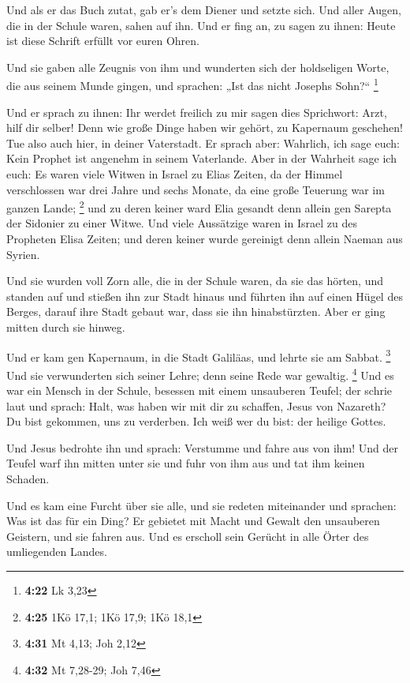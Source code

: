  Und als er das Buch zutat, gab er's dem Diener und
setzte sich. Und aller Augen, die in der Schule waren, sahen auf ihn.
 Und er fing an, zu sagen zu ihnen: Heute ist diese
Schrift erfüllt vor euren Ohren.

 Und sie gaben alle Zeugnis von ihm und wunderten sich
der holdseligen Worte, die aus seinem Munde gingen, und sprachen: „Ist
das nicht Josephs Sohn?{}`` \footnote{\textbf{4:22} Lk 3,23}

 Und er sprach zu ihnen: Ihr werdet freilich zu mir sagen
dies Sprichwort: Arzt, hilf dir selber! Denn wie große Dinge haben wir
gehört, zu Kapernaum geschehen! Tue also auch hier, in deiner
Vaterstadt.  Er sprach aber: Wahrlich, ich sage euch:
Kein Prophet ist angenehm in seinem Vaterlande.  Aber in
der Wahrheit sage ich euch: Es waren viele Witwen in Israel zu Elias
Zeiten, da der Himmel verschlossen war drei Jahre und sechs Monate, da
eine große Teuerung war im ganzen Lande; \footnote{\textbf{4:25} 1Kö
  17,1; 1Kö 17,9; 1Kö 18,1}  und zu deren keiner ward
Elia gesandt denn allein gen Sarepta der Sidonier zu einer Witwe.
 Und viele Aussätzige waren in Israel zu des Propheten
Elisa Zeiten; und deren keiner wurde gereinigt denn allein Naeman aus
Syrien.

 Und sie wurden voll Zorn alle, die in der Schule waren,
da sie das hörten,  und standen auf und stießen ihn zur
Stadt hinaus und führten ihn auf einen Hügel des Berges, darauf ihre
Stadt gebaut war, dass sie ihn hinabstürzten.  Aber er
ging mitten durch sie hinweg.

 Und er kam gen Kapernaum, in die Stadt Galiläas, und
lehrte sie am Sabbat. \footnote{\textbf{4:31} Mt 4,13; Joh 2,12}
 Und sie verwunderten sich seiner Lehre; denn seine Rede
war gewaltig. \footnote{\textbf{4:32} Mt 7,28-29; Joh 7,46}
 Und es war ein Mensch in der Schule, besessen mit einem
unsauberen Teufel; der schrie laut  und sprach: Halt, was
haben wir mit dir zu schaffen, Jesus von Nazareth? Du bist gekommen, uns
zu verderben. Ich weiß wer du bist: der heilige Gottes.

 Und Jesus bedrohte ihn und sprach: Verstumme und fahre
aus von ihm! Und der Teufel warf ihn mitten unter sie und fuhr von ihm
aus und tat ihm keinen Schaden.

 Und es kam eine Furcht über sie alle, und sie redeten
miteinander und sprachen: Was ist das für ein Ding? Er gebietet mit
Macht und Gewalt den unsauberen Geistern, und sie fahren aus.
 Und es erscholl sein Gerücht in alle Örter des
umliegenden Landes.

